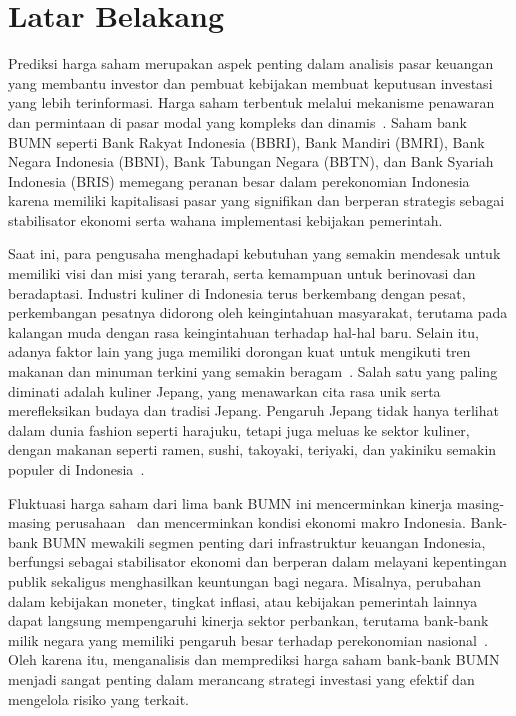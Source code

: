 \documentclass[a4paper,12pt]{report}
\begin{document}
\section{Latar Belakang}
Prediksi harga saham merupakan aspek penting dalam analisis pasar keuangan yang membantu
investor dan pembuat kebijakan membuat keputusan investasi yang lebih terinformasi. Harga saham
terbentuk melalui mekanisme penawaran dan permintaan di pasar modal yang kompleks dan
dinamis~\cite{ref1,ref2,ref3,ref4}. Saham bank BUMN seperti Bank Rakyat Indonesia (BBRI), Bank Mandiri (BMRI),
Bank Negara Indonesia (BBNI), Bank Tabungan Negara (BBTN), dan Bank Syariah Indonesia (BRIS)
memegang peranan besar dalam perekonomian Indonesia karena memiliki kapitalisasi pasar yang
signifikan dan berperan strategis sebagai stabilisator ekonomi serta wahana implementasi
kebijakan pemerintah.

Saat ini, para pengusaha menghadapi kebutuhan yang semakin mendesak untuk memiliki visi dan
misi yang terarah, serta kemampuan untuk berinovasi dan beradaptasi. Industri kuliner di
Indonesia terus berkembang dengan pesat, perkembangan pesatnya didorong oleh keingintahuan
masyarakat, terutama pada kalangan muda dengan rasa keingintahuan terhadap hal-hal baru. Selain
itu, adanya faktor lain yang juga memiliki dorongan kuat untuk mengikuti tren makanan dan
minuman terkini yang semakin beragam~\cite{ref1}. Salah satu yang paling diminati adalah kuliner
Jepang, yang menawarkan cita rasa unik serta merefleksikan budaya dan tradisi Jepang. Pengaruh
Jepang tidak hanya terlihat dalam dunia fashion seperti harajuku, tetapi juga meluas ke sektor
kuliner, dengan makanan seperti ramen, sushi, takoyaki, teriyaki, dan yakiniku semakin populer
di Indonesia~\cite{ref2}.

Fluktuasi harga saham dari lima bank BUMN ini mencerminkan kinerja masing-masing
perusahaan~\cite{ref5} dan mencerminkan kondisi ekonomi makro Indonesia. Bank-bank BUMN mewakili segmen
penting dari infrastruktur keuangan Indonesia, berfungsi sebagai stabilisator ekonomi dan
berperan dalam melayani kepentingan publik sekaligus menghasilkan keuntungan bagi negara.
Misalnya, perubahan dalam kebijakan moneter, tingkat inflasi, atau kebijakan pemerintah lainnya
dapat langsung mempengaruhi kinerja sektor perbankan, terutama bank-bank milik negara yang
memiliki pengaruh besar terhadap perekonomian nasional~\cite{ref6}. Oleh karena itu, menganalisis dan
memprediksi harga saham bank-bank BUMN menjadi sangat penting dalam merancang strategi
investasi yang efektif dan mengelola risiko yang terkait.
\end{document}
